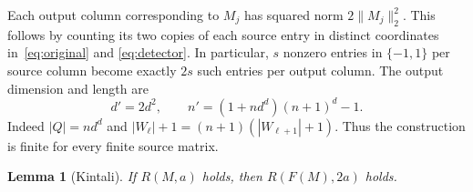 \documentclass[11pt]{article}
\newtheorem{lemma}[theorem]{Lemma}
\begin{document}
Each output column corresponding to $M_j$ has squared norm
$2\|M_j\|_2^2$. This follows by counting its two copies of each source
entry in distinct coordinates in~\eqref{eq:original} and
\eqref{eq:detector}. In particular, $s$ nonzero entries in $\{-1,1\}$
per source column become exactly $2s$ such entries per output column.
The output dimension and length are
\begin{equation}\label{eq:size}
d'=2d^2,\qquad n'=(1+nd^d)(n+1)^d-1.
\end{equation}
Indeed $|Q|=nd^d$ and $|W_\ell|+1=(n+1)(|W_{\ell+1}|+1)$.
Thus the construction is finite for every finite source matrix.

\begin{lemma}[Kintali]\label{lem:amplify}
If $R(M,a)$ holds, then $R(F(M),2a)$ holds.
\end{lemma}
\end{document}
